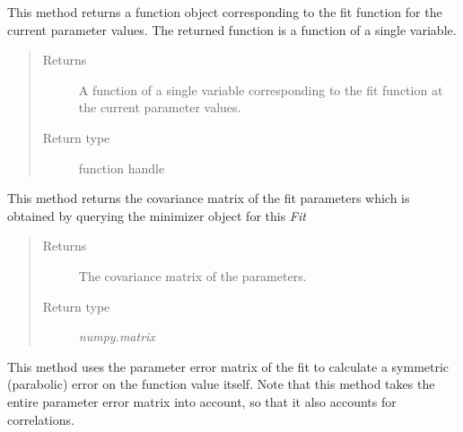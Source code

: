 \documentclass[a4paper,10pt,english]{sphinxmanual}
\begin{document}
\begin{fulllineitems}
\begin{fulllineitems}
\end{fulllineitems}


\begin{fulllineitems}
\label{index:kafe.fit.Fit.get_current_fit_function}
This method returns a function object corresponding to the fit function
for the current parameter values. The returned function is a function
of a single variable.
\begin{quote}\begin{description}
\item[{Returns}] \leavevmode
A function of a single variable corresponding to the fit function
at the current parameter values.

\item[{Return type}] \leavevmode
function handle

\end{description}\end{quote}

\end{fulllineitems}


\begin{fulllineitems}
\label{index:kafe.fit.Fit.get_error_matrix}
This method returns the covariance matrix of the fit parameters which
is obtained by querying the minimizer object for this \emph{Fit}
\begin{quote}\begin{description}
\item[{Returns}] \leavevmode
The covariance matrix of the parameters.

\item[{Return type}] \leavevmode
\emph{numpy.matrix}

\end{description}\end{quote}

\end{fulllineitems}


\begin{fulllineitems}
\label{index:kafe.fit.Fit.get_function_error}
This method uses the parameter error matrix of the fit to calculate
a symmetric (parabolic) error on the function value itself. Note that
this method takes the entire parameter error matrix into account, so
that it also accounts for correlations.


\end{fulllineitems}
\end{fulllineitems}
\end{document}
